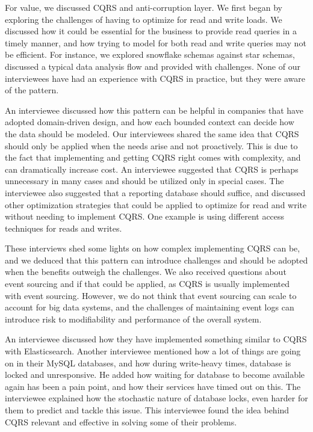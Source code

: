 \documentclass{bmcart}
\begin{document}
For value, we discussed CQRS and anti-corruption layer. We first began by exploring the challenges of having to optimize for read and write loads. We discussed how it could be essential for the business to provide read queries in a timely manner, and how trying to model for both read and write queries may not be efficient. For instance, we explored snowflake schemas against star schemas, discussed a typical data analysis flow and provided with challenges. None of our interviewees have had an experience with CQRS in practice, but they were aware of the pattern. 

An interviewee discussed how this pattern can be helpful in companies that have adopted domain-driven design, and how each bounded context can decide how the data should be modeled. Our interviewees shared the same idea that CQRS should only be applied when the needs arise and not proactively. This is due to the fact that implementing and getting CQRS right comes with complexity, and can dramatically increase cost. An interviewee suggested that CQRS is perhaps unnecessary in many cases and should be utilized only in special cases. The interviewee also suggested that a reporting database should suffice, and discussed other optimization strategies that could be applied to optimize for read and write without needing to implement CQRS. One example is using different access techniques for reads and writes. 

These interviews shed some lights on how complex implementing CQRS can be, and we deduced that this pattern can introduce challenges and should be adopted when the benefits outweigh the challenges. We also received questions about event sourcing and if that could be applied, as CQRS is usually implemented with event sourcing. However, we do not think that event sourcing can scale to account for big data systems, and the challenges of maintaining event logs can introduce risk to modifiability and performance of the overall system. 


An interviewee discussed how they have implemented something similar to CQRS with Elasticsearch. Another interviewee mentioned how a lot of things are going on in their MySQL databases, and how during write-heavy times, database is locked and unresponsive. He added how waiting for database to become available again has been a pain point, and how their services have timed out on this. The interviewee explained how the stochastic nature of database locks, even harder for them to predict and tackle this issue. This interviewee found the idea behind CQRS relevant and effective in solving some of their problems. 
\end{document}
